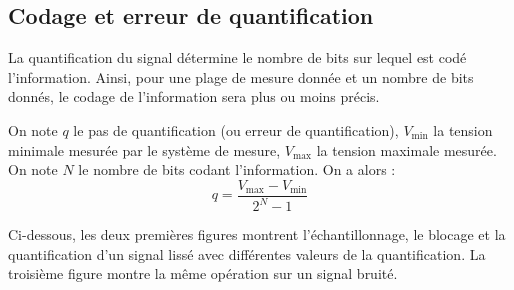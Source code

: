 \documentclass[10pt,fleqn]{article} %
\begin{document}
\subsection{Codage et erreur de quantification}
La quantification du signal détermine le nombre de bits sur lequel est codé l'information. Ainsi, pour une plage de mesure donnée et un nombre de bits donnés, le codage de l'information sera plus ou moins précis.

\begin{defi}
On note $q$ le pas de quantification (ou erreur de quantification), $V_{\text{min}}$ la tension minimale mesurée par le système de mesure, $V_{\text{max}}$ la tension maximale mesurée. On note $N$ le nombre de bits codant l'information. On a alors :
$$
q = \dfrac{V_{\text{max}}-V_{\text{min}}}{2^N -1}
$$
\end{defi}

Ci-dessous, les deux premières figures montrent l'échantillonnage, le blocage et la quantification d'un signal lissé avec différentes valeurs de la quantification. La troisième figure montre la même opération sur un signal bruité.
\end{document}
